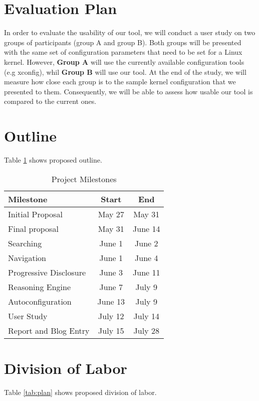 \documentclass{chi2009}
\begin{document}
\section{Evaluation Plan}

In order to evaluate the usability of our tool, we will conduct a user study on two groups of participants (group A and group B). Both groups will be presented with the same set of configuration parameters that need to be set for a Linux kernel. However, \textbf{Group A} will use the currently available configuration tools (e.g xconfig), whil \textbf{Group B} will use our tool. At the end of the study, we will measure how close each group is to the sample kernel configuration that we presented to them. Consequently, we will be able to assess how usable our tool is compared to the current ones.

\section{Outline}
Table \ref{tab:outline} shows proposed outline.

\begin{table}[!h]
\centering
\begin{tabularx}{0.5\textwidth}{X c c}
\toprule
\textbf{Milestone} & \textbf{Start} & \textbf{End}\\ \midrule
Initial Proposal & May 27 & May 31\\
Final proposal & May 31 & June 14 \\
Searching & June 1 & June 2\\
Navigation & June 1 & June 4\\
Progressive Disclosure & June 3 & June 11\\
Reasoning Engine & June 7 & July 9\\
Autoconfiguration & June 13 & July 9\\
User Study & July 12 & July 14\\
Report and Blog Entry & July 15 & July 28\\
\bottomrule
\end{tabularx}
\caption{Project Milestones}
\label{tab:outline}
\end{table}

\section{Division of Labor}
Table \ref{tab:plan} shows proposed division of labor.
\end{document}
